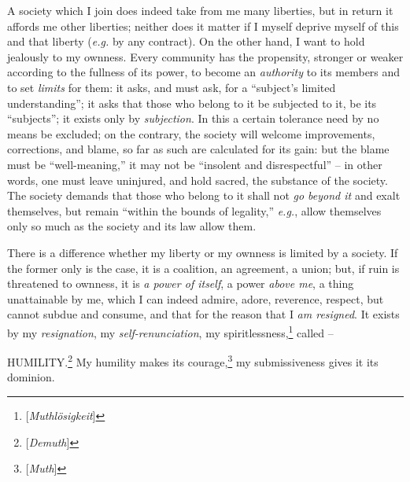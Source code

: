 A society which I join does indeed take from me many liberties, but in return 
it affords me other liberties; neither does it matter if I myself deprive 
myself of this and that liberty (\textit{e.g.} by any contract). On the other 
hand, I want to hold jealously to my ownness. Every community has the 
propensity, stronger or weaker according to the fullness of its power, to 
become an \textit{authority} to its members and to set \textit{limits} for 
them: it asks, and must ask, for a ``subject's limited understanding''; it 
asks that those who belong to it be subjected to it, be its ``subjects''; it 
exists only by \textit{subjection}. In this a certain tolerance need by no 
means be excluded; on the contrary, the society will welcome improvements, 
corrections, and blame, so far as such are calculated for its gain: but the 
blame must be ``well-meaning,'' it may not be ``insolent and 
disrespectful'' -- in other words, one must leave uninjured, and hold sacred, 
the substance of the society. The society demands that those who belong to it 
shall not \textit{go beyond it} and exalt themselves, but remain ``within the 
bounds of legality,'' \textit{e.g.}, allow themselves only so much as the 
society and its law allow them.

There is a difference whether my liberty or my ownness is limited by a 
society. If the former only is the case, it is a coalition, an agreement, a 
union; but, if ruin is threatened to ownness, it is \textit{a power of 
itself}, a power \textit{above me}, a thing unattainable by me, which I can 
indeed admire, adore, reverence, respect, but cannot subdue and consume, and 
that for the reason that I \textit{am resigned}. It exists by my 
\textit{resignation}, my \textit{self-renunciation}, my 
spiritlessness,\footnote{[\textit{Muthl\"osigkeit}]} called --

HUMILITY.\footnote{[\textit{Demuth}]} My humility makes its 
courage,\footnote{[\textit{Muth}]} my submissiveness gives it its dominion.

